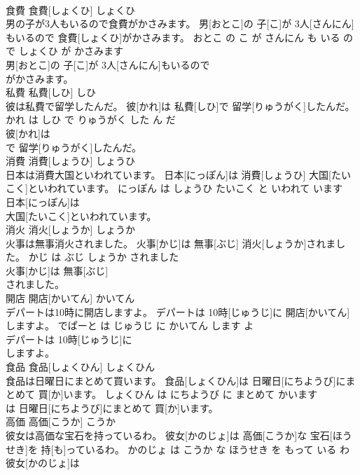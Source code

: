 \documentclass[8pt]{extreport}
\begin{document}
\begin{CJK}{UTF8}{min}
\\	食費	食費[しょくひ]	しょくひ	
\\	男の子が3人もいるので食費がかさみます。	男[おとこ]の 子[こ]が 3人[さんにん]もいるので 食費[しょくひ]がかさみます。	おとこ の こ が さんにん も いる の で しょくひ が かさみます	
\\	男[おとこ]の 子[こ]が 3人[さんにん]もいるので
\\	がかさみます。			
\\	私費	私費[しひ]	しひ	
\\	彼は私費で留学したんだ。	彼[かれ]は 私費[しひ]で 留学[りゅうがく]したんだ。	かれ は しひ で りゅうがく した ん だ	
\\	彼[かれ]は
\\	で 留学[りゅうがく]したんだ。			
\\	消費	消費[しょうひ]	しょうひ	
\\	日本は消費大国といわれています。	日本[にっぽん]は 消費[しょうひ] 大国[たいこく]といわれています。	にっぽん は しょうひ たいこく と いわれて います	
\\	日本[にっぽん]は
\\	大国[たいこく]といわれています。			
\\	消火	消火[しょうか]	しょうか	
\\	火事は無事消火されました。	火事[かじ]は 無事[ぶじ] 消火[しょうか]されました。	かじ は ぶじ しょうか されました	
\\	火事[かじ]は 無事[ぶじ]
\\	されました。			
\\	開店	開店[かいてん]	かいてん	
\\	デパートは10時に開店しますよ。	デパートは 10時[じゅうじ]に 開店[かいてん]しますよ。	でぱーと は じゅうじ に かいてん します よ	
\\	デパートは 10時[じゅうじ]に
\\	しますよ。			
\\	食品	食品[しょくひん]	しょくひん	
\\	食品は日曜日にまとめて買います。	食品[しょくひん]は 日曜日[にちようび]にまとめて 買[か]います。	しょくひん は にちようび に まとめて かいます	
\\	は 日曜日[にちようび]にまとめて 買[か]います。			
\\	高価	高価[こうか]	こうか	
\\	彼女は高価な宝石を持っているわ。	彼女[かのじょ]は 高価[こうか]な 宝石[ほうせき]を 持[も]っているわ。	かのじょ は こうか な ほうせき を もって いる わ	
\\	彼女[かのじょ]は

\end{CJK}
\end{document}
